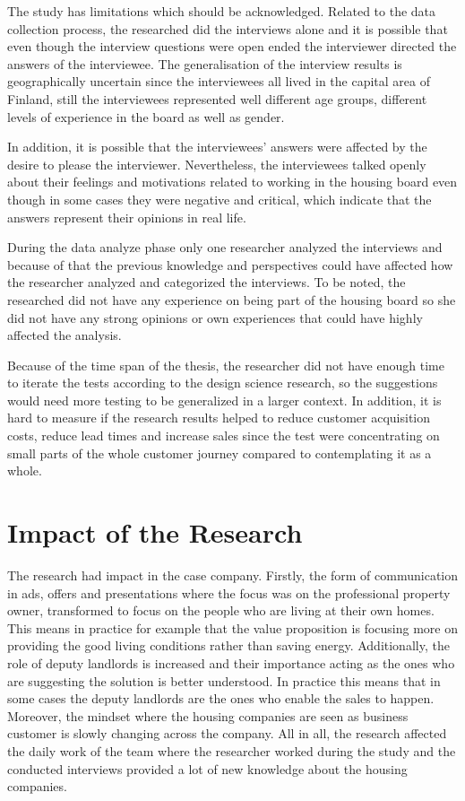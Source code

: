 The study has limitations which should be acknowledged. Related to the data collection process, the researched did the interviews alone and it is possible that even though the interview questions were open ended the interviewer directed the answers of the interviewee. The generalisation of the interview results is geographically uncertain since the interviewees all lived in the capital area of Finland, still the interviewees represented well different age groups, different levels of experience in the board as well as gender.

In addition, it is possible that the interviewees' answers were affected by the desire to please the interviewer. Nevertheless, the interviewees talked openly about their feelings and motivations related to working in the housing board even though in some cases they were negative and critical, which indicate that the answers represent their opinions in real life. 

During the data analyze phase only one researcher analyzed the interviews and because of that the previous knowledge and perspectives could have affected how the researcher analyzed and categorized the interviews. To be noted, the researched did not have any experience on being part of the housing board so she did not have any strong opinions or own experiences that could have highly affected the analysis.

Because of the time span of the thesis, the researcher did not have enough time to iterate the tests according to the design science research, so the suggestions would need more testing to be generalized in a larger context. In addition, it is hard to measure if the research results helped to reduce customer acquisition costs, reduce lead times and increase sales since the test were concentrating on small parts of the whole customer journey compared to contemplating it as a whole.

\section{Impact of the Research}

The research had impact in the case company. Firstly, the form of communication in ads, offers and presentations where the focus was on the professional property owner, transformed to focus on the people who are living at their own homes. This means in practice for example that the value proposition is focusing more on providing the good living conditions rather than saving energy. Additionally, the role of deputy landlords is increased and their importance acting as the ones who are suggesting the solution is better understood. In practice this means that in some cases the deputy landlords are the ones who enable the sales to happen. Moreover, the mindset where the housing companies are seen as business customer is slowly changing across the company. All in all, the research affected the daily work of the team where the researcher worked during the study and the conducted interviews provided a lot of new knowledge about the housing companies.

